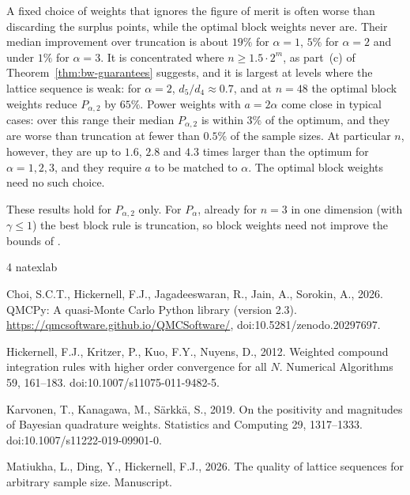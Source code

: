 \documentclass[preprint,12pt,authoryear]{elsarticle}
\begin{document}
A fixed choice of weights that ignores the figure of merit is often worse
than discarding the surplus points, while the optimal block weights never
are. Their median improvement over truncation is about $19\%$ for
$\alpha=1$, $5\%$ for $\alpha=2$ and under $1\%$ for $\alpha=3$. It is
concentrated where $n\ge1.5\cdot2^m$, as part~(c) of
Theorem~\ref{thm:bw-guarantees} suggests, and it is largest at levels where
the lattice sequence is weak: for $\alpha=2$, $d_5/d_4\approx0.7$, and at
$n=48$ the optimal block weights reduce $P_{\alpha,2}$ by $65\%$. Power
weights with $a=2\alpha$ come close in typical cases: over this range their
median $P_{\alpha,2}$ is within $3\%$ of the optimum, and they are worse than
truncation at fewer than $0.5\%$ of the sample sizes. At particular $n$,
however, they are up to $1.6$, $2.8$ and $4.3$ times larger than the optimum
for $\alpha=1,2,3$, and they require $a$ to be matched to $\alpha$. The
optimal block weights need no such choice.

These results hold for $P_{\alpha,2}$ only. For $P_\alpha$, already for
$n=3$ in one dimension (with $\gamma\le1$) the best block rule is
truncation, so block weights need not improve the bounds of \citet[Section~4]{MDH26}.

\begin{thebibliography}{4}
\expandafter\ifx\csname natexlab\endcsname\relax\def\natexlab#1{#1}\fi

Choi, S.C.T., Hickernell, F.J., Jagadeeswaran, R., Jain, A., Sorokin, A., 2026.
{QMCPy}: A quasi-{Monte Carlo} {Python} library (version 2.3).
\url{https://qmcsoftware.github.io/QMCSoftware/}, doi:10.5281/zenodo.20297697.

Hickernell, F.J., Kritzer, P., Kuo, F.Y., Nuyens, D., 2012. Weighted compound
integration rules with higher order convergence for all {$N$}. Numerical
Algorithms 59, 161--183. doi:10.1007/s11075-011-9482-5.

Karvonen, T., Kanagawa, M., S\"arkk\"a, S., 2019. On the positivity and
magnitudes of {Bayesian} quadrature weights. Statistics and Computing 29,
1317--1333. doi:10.1007/s11222-019-09901-0.

Matiukha, L., Ding, Y., Hickernell, F.J., 2026. The quality of lattice
sequences for arbitrary sample size. Manuscript.

\end{thebibliography}
\end{document}
